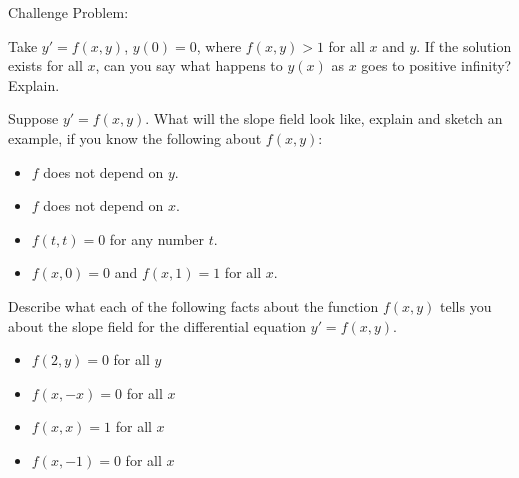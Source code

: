 \documentclass{ximera}
\begin{document}
\begin{exercise}
    Challenge Problem:
    
    Take $y' = f(x,y)$, $y(0) = 0$, where $f(x,y) > 1$ for all $x$ and $y$.  If the solution exists for all $x$, can you say what happens to $y(x)$ as $x$ goes to positive infinity?  Explain.
\end{exercise}

\begin{exercise}
    Suppose $y' = f(x,y)$.  What will the slope field look like, explain and sketch an example, if you know the following about $f(x,y)$:
    \begin{itemize}
        \item $f$ does not depend on $y$.
        \item $f$ does not depend on $x$.
        \item $f(t,t) = 0$ for any number $t$.
        \item $f(x,0) = 0$ and $f(x,1) = 1$ for all $x$.
    \end{itemize}
\end{exercise}

\begin{exercise}
    Describe what each of the following facts about the function $f(x,y)$ tells you about the slope field for the differential equation $y' = f(x,y)$.
    \begin{itemize}
        \item $f(2,y) = 0$ for all $y$
        \item $f(x,-x) = 0$ for all $x$
        \item $f(x,x) = 1$ for all $x$
        \item $f(x, -1) = 0$ for all $x$
    \end{itemize}
\end{exercise}

\end{document}
